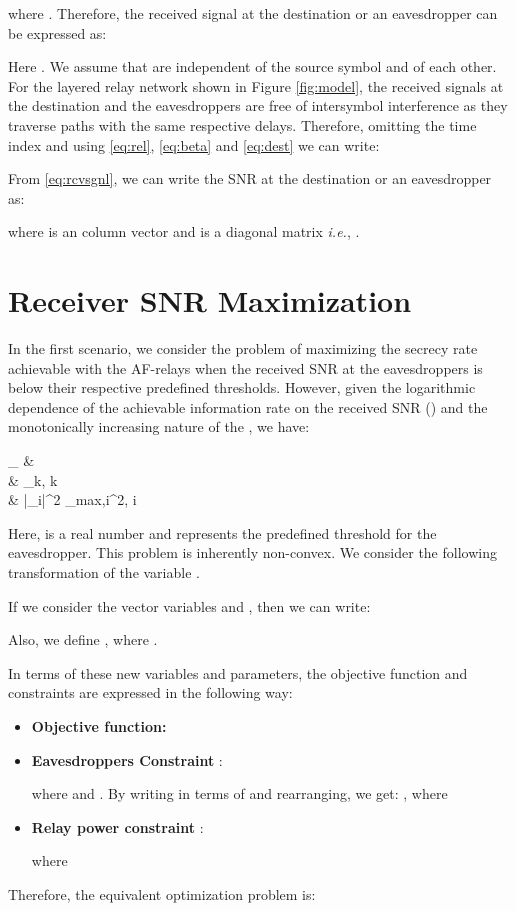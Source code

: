 \documentclass[journal,,draftclsnofoot letterpaper, onecolumn]{IEEEtran}
\begin{document}
where 
. Therefore, the received signal at the destination or an eavesdropper can be expressed as:

Here . We assume that  are independent of the source symbol and of each other. For the layered relay network shown in Figure \ref{fig:model}, 
the received signals at the destination and the eavesdroppers are free of intersymbol interference as they traverse paths with the same respective delays. Therefore, omitting the time index and using \eqref{eq:rel}, \eqref{eq:beta} and \eqref{eq:dest} we can write:

From \eqref{eq:rcvsgnl}, we can write the SNR at the destination or an eavesdropper as:
 
where  is an  column vector  and  is a  diagonal matrix \textit{i.e.}, .
  


\section{Receiver SNR Maximization}
\label{SNR}
In the first scenario, we consider the problem of maximizing the secrecy rate achievable with the AF-relays when the received SNR at the eavesdroppers is below their respective predefined thresholds. However, given the logarithmic dependence of the achievable information rate on the received SNR () and the monotonically increasing nature of the , we have:
      
       \;\max_{\bm{\beta}} \; &  \\
        \; &  \le \gamma_k, \; k \in {}\\
       		                &  |\beta_i|^2 \le \beta_{max,i}^2, i \in {}
      
      Here,  is a real number and represents the predefined threshold for the  eavesdropper. This problem is inherently non-convex. We consider the following transformation of the variable .

       If we consider the vector variables  and , then we can write:
       
Also, we define , where .

In terms of these new variables and parameters, the objective function and constraints are expressed in the following way:
\begin{itemize}
\item \textbf{Objective function:}


\item \textbf{Eavesdroppers Constraint} : 

where  and . By writing in terms of  and rearranging, we get: , where 


\item \textbf{Relay power constraint} : 

where 

\end{itemize}
Therefore, the equivalent optimization problem is:
\end{document}
